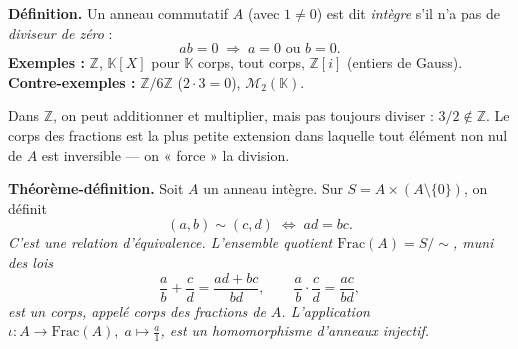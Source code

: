 ﻿%



\begin{tcolorbox}[thmbox]
  \textbf{Définition.}\enspace%
  Un anneau commutatif $A$ (avec $1 \neq 0$) est dit \emph{intègre} s'il
  n'a pas de \emph{diviseur de zéro} :
  \[
    ab = 0 \;\Rightarrow\; a = 0 \text{ ou } b = 0.
  \]
  \textbf{Exemples :} $\mathbb{Z}$, $\mathbb{K}[X]$ pour $\mathbb{K}$ corps,
  tout corps, $\mathbb{Z}[i]$ (entiers de Gauss).\\
  \textbf{Contre-exemples :} $\mathbb{Z}/6\mathbb{Z}$ ($2\cdot 3=0$),
  $\mathcal{M}_2(\mathbb{K})$.
\end{tcolorbox}

Dans $\mathbb{Z}$, on peut additionner et multiplier, mais pas toujours diviser :
$3/2 \notin \mathbb{Z}$. Le corps des fractions est la plus petite extension
dans laquelle tout élément non nul de $A$ est inversible — on « force » la division.

\decsep{}


\begin{tcolorbox}[thmbox]
  \textbf{Théorème-définition.}\enspace%
  Soit $A$ un anneau intègre. Sur $S = A \times (A\setminus\{0\})$, on définit
  \[
    (a,b) \sim (c,d) \;\iff\; ad = bc.
  \]
  \textit{C'est une relation d'équivalence. L'ensemble quotient
  $\mathrm{Frac}(A) = S/{\sim}$, muni des lois}
  \[
    \frac{a}{b} + \frac{c}{d} = \frac{ad+bc}{bd},
    \qquad
    \frac{a}{b} \cdot \frac{c}{d} = \frac{ac}{bd},
  \]
  \textit{est un corps, appelé \emph{corps des fractions} de $A$.
  L'application $\iota : A \to \mathrm{Frac}(A),\; a \mapsto \tfrac{a}{1}$,
  est un homomorphisme d'anneaux injectif.}
\end{tcolorbox}

